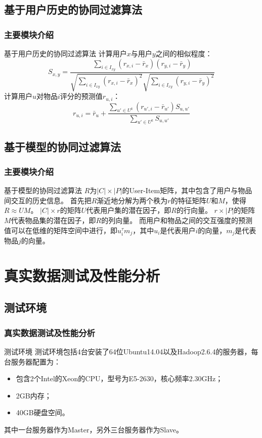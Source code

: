 \documentclass{beamer}
\begin{document}
\subsection{基于用户历史的协同过滤算法}
\begin{frame}
	\frametitle{主要模块介绍}
		\begin{block}{基于用户历史的协同过滤算法}
		计算用户$x$与用户$y$之间的相似程度：
\begin{equation*}
S_{x,y} = \frac{\sum_{i\in I_{xy}}(r_{x,i}-\bar{r}_x)(r_{y,i}-\bar{r}_y)}{\sqrt{\sum_{i\in I_{xy}}(r_{x,i}-\bar{r}_x)^2}\sqrt{\sum_{i\in I_{xy}}(r_{y,i}-\bar{r}_y)^2}}
\end{equation*}
计算用户$u$对物品$i$评分的预测值$r_{u,i}$：
\begin{equation*}
r_{u,i} = \bar{r}_u + \frac{\sum_{u'\in U^k}(r_{u',i}-\bar{r}_{u'})S_{u,u'}}{\sum_{u'\in U^k}S_{u,u'}}
\end{equation*}
		\end{block}
\end{frame}


\subsection{基于模型的协同过滤算法}
\begin{frame}
	\frametitle{主要模块介绍}
		\begin{block}{基于模型的协同过滤算法}
		$R$为$|C|\times|P|$的User-Item矩阵，其中包含了用户与物品间交互的历史信息。
		首先把$R$渐近地分解为两个秩为$r$的特征矩阵$U$和$M$，使得$R\approx UM$。
$|C|\times r$的矩阵$U$代表用户集的潜在因子，即$R$的行向量。
$r\times |P|$的矩阵$M$代表物品集的潜在因子，即$R$的列向量。
而用户和物品之间的交互强度的预测值可以在低维的矩阵空间中进行，即$u_i^\tau m_j$，其中$u_i$是代表用户$i$的向量，$m_j$是代表物品$j$的向量。
		\end{block}
\end{frame}

\section{真实数据测试及性能分析}
\subsection{测试环境}
\begin{frame}
	\frametitle{真实数据测试及性能分析}
		\begin{block}{测试环境}
		测试环境包括4台安装了64位Ubuntu14.04以及Hadoop2.6.4的服务器，每台服务器配置为：
		\begin{itemize}
		\item 包含2个Intel的Xeon的CPU，型号为E5-2630，核心频率2.30GHz；
		\item 2GB内存；
		\item 40GB硬盘空间。
	\end{itemize}
		其中一台服务器作为Master，另外三台服务器作为Slave。
		\end{block}
\end{frame}
\end{document}
